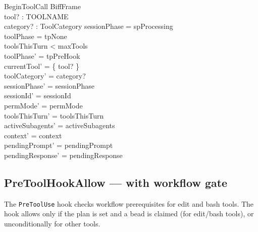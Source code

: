\documentclass[a4paper,10pt,fleqn]{article}
\begin{document}
\begin{schema}{BeginToolCall}
  BiffFrame \\
  tool? : TOOLNAME \\
  category? : ToolCategory
  \where
  sessionPhase = spProcessing \\
  toolPhase = tpNone \\
  toolsThisTurn < maxTools \\
  toolPhase' = tpPreHook \\
  currentTool' = \{ tool? \} \\
  toolCategory' = category? \\
  sessionPhase' = sessionPhase \\
  sessionId' = sessionId \\
  permMode' = permMode \\
  toolsThisTurn' = toolsThisTurn \\
  activeSubagents' = activeSubagents \\
  context' = context \\
  pendingPrompt' = pendingPrompt \\
  pendingResponse' = pendingResponse
\end{schema}

\subsection{PreToolHookAllow --- with workflow gate}

The \texttt{PreToolUse} hook checks workflow prerequisites for
edit and bash tools. The hook allows only if the plan is set and
a bead is claimed (for edit/bash tools), or unconditionally for
other tools.
\end{document}
